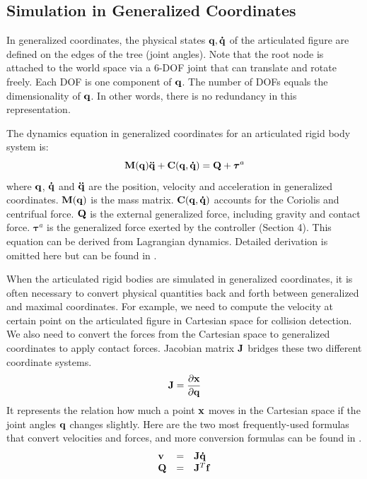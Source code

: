 \subsection{Simulation in Generalized Coordinates}
In generalized coordinates, the physical states $\mathbf{q}, \mathbf{\dot{q}}$ of the articulated figure are defined on the edges of the tree (joint angles). Note that the root node is attached to the world space via a 6-DOF joint that can translate and rotate freely. Each DOF is one component of $\mathbf{q}$. The number of DOFs equals the dimensionality of $\mathbf{q}$. In other words, there is no redundancy in this representation.

The dynamics equation in generalized coordinates for an articulated rigid body system is:
\begin{equation}
  \vc{M}(\vc{q})\vc{\ddot{q}}+\vc{C(q,\dot{q})}=\vc{Q}+\boldsymbol{\tau}^a
  \label{eq:generalized}
\end{equation}
where $\mathbf{q}$, $\mathbf{\dot{q}}$ and $\mathbf{\ddot{q}}$ are the position, velocity and acceleration in generalized coordinates. $\mathbf{M(q)}$ is the mass matrix. $\mathbf{C(q,\dot{q})}$ accounts for the Coriolis and centrifual force. $\mathbf{Q}$ is the external generalized force, including gravity and contact force. $\boldsymbol{\tau}^a$ is the generalized force exerted by the controller (Section 4). This equation can be derived from Lagrangian dynamics. Detailed derivation is omitted here but can be found in \citet{Liu:2012:STM}.

When the articulated rigid bodies are simulated in generalized coordinates, it is often necessary to convert physical quantities back and forth between generalized and maximal coordinates. For example, we need to compute the velocity at certain point on the articulated figure in Cartesian space for collision detection. We also need to convert the forces from the Cartesian space to generalized coordinates to apply contact forces. Jacobian matrix $\mathbf{J}$  bridges these two different coordinate systems.  
\begin{equation}
\mathbf{J}=\frac{\partial \mathbf{x}}{\partial \mathbf{q}}
\end{equation}
It represents the relation how much a point $\mathbf{x}$ moves in the Cartesian space if the joint angles $\mathbf{q}$ changes slightly. Here are the two most frequently-used formulas that convert velocities and forces, and more conversion formulas can be found in \citet{Liu:2012:STM}. 
\begin{displaymath}
  \begin{array}{lll}
    \mathbf{v} & = & \mathbf{J}\mathbf{\dot{q}}\\
    \mathbf{Q} & = &\mathbf{J}^T\mathbf{f}
   \end{array}
\end{displaymath}


